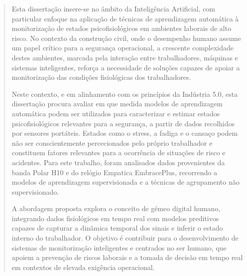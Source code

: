 {%
{\renewcommand{\keywordnames}{Aprendizagem Automática, Gémeo Digital, Modelos Preditivos, Previsão Fisiológica, Tecnologias Emergentes, Trabalhadores de Alto Risco}
\begin{abstract}


Esta dissertação insere-se no âmbito da Inteligência Artificial, com particular enfoque na aplicação de técnicas de aprendizagem automática à monitorização de estados psicofisiológicos em ambientes laborais de alto risco. No contexto da construção civil, onde o desempenho humano assume um papel crítico para a segurança operacional, a crescente complexidade destes ambientes, marcada pela interação entre trabalhadores, máquinas e sistemas inteligentes, reforça a necessidade de soluções capazes de apoiar a monitorização das condições fisiológicas dos trabalhadores.

Neste contexto, e em alinhamento com os princípios da Indústria 5.0, esta dissertação procura avaliar em que medida modelos de aprendizagem automática podem ser utilizados para caracterizar e estimar estados psicofisiológicos relevantes para a segurança, a partir de dados recolhidos por sensores portáteis. Estados como o stress, a fadiga e o cansaço podem não ser conscientemente percecionados pelo próprio trabalhador e constituem fatores relevantes para a ocorrência de situações de risco e acidentes. Para este trabalho, foram analisados dados provenientes da banda Polar H10 e do relógio Empatica EmbracePlus, recorrendo a modelos de aprendizagem supervisionada e a técnicas de agrupamento não supervisionado.

A abordagem proposta explora o conceito de gémeo digital humano, integrando dados fisiológicos em tempo real com modelos preditivos capazes de capturar a dinâmica temporal dos sinais e inferir o estado interno do trabalhador. O objetivo é contribuir para o desenvolvimento de sistemas de monitorização inteligentes e centrados no ser humano, que apoiem a prevenção de riscos laborais e a tomada de decisão em tempo real em contextos de elevada exigência operacional.

\end{abstract}
}%

{%
\renewcommand{\keywordnames}{Digital Twin, Emerging Technologies, High-Risk Workers, Machine Learning, Physiological Prediction, Predictive Models}
\begin{abstractotherlanguage}


\end{abstractotherlanguage}}}

